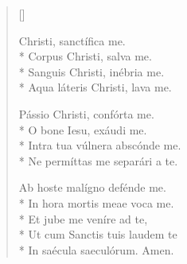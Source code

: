 \newHymn
{}
\settowidth{\versewidth}{Anima Christi, sanctifica me}

\begin{verse}[\versewidth]

 Christi, sanctífica me.\\*
Corpus Christi, salva me.\\*
Sanguis Christi, inébria me.\\*
Aqua láteris Christi, lava me.
\pointtrans

Pássio Christi, confórta me.\\*
O bone Iesu, exáudi me.\\*
Intra tua vúlnera abscónde me.\\*
Ne permíttas me separári a te.

Ab hoste malígno defénde me.\\*
In hora mortis meae voca me.\\*
Et jube me veníre ad te,\\*
Ut cum Sanctis tuis laudem te\\*
In saécula saeculórum.
Amen.

\end{verse}






